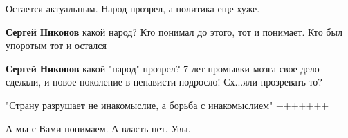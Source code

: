 \begin{itemize}
 
Остается актуальным. Народ прозрел, а политика еще хуже.

\begin{itemize}
 
\textbf{Сергей Никонов} какой народ? Кто понимал до этого, тот и понимает. Кто был упоротым тот и остался

 
\textbf{Сергей Никонов} какой "народ" прозрел? 7 лет промывки мозга свое дело сделали, и новое поколение в ненависти подросло! Сх...яли прозревать то?
\end{itemize}

 
"Страну разрушает не инакомыслие, а борьба с инакомыслием" +++++++

 
А мы с Вами понимаем.
А власть нет. Увы.

\begin{itemize}
 

\end{itemize}
\end{itemize}
